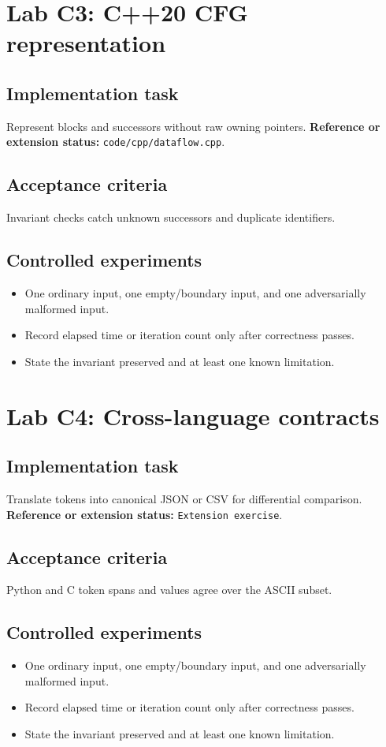 \documentclass[10pt,letterpaper]{article}
\begin{document}
\section{Lab C3: C++20 CFG representation}
\subsection{Implementation task}
Represent blocks and successors without raw owning pointers.
\textbf{Reference or extension status:} \nolinkurl{code/cpp/dataflow.cpp}.\par\subsection{Acceptance criteria}
Invariant checks catch unknown successors and duplicate identifiers.
\subsection{Controlled experiments}
\begin{itemize}
\item One ordinary input, one empty/boundary input, and one adversarially malformed input.
\item Record elapsed time or iteration count only after correctness passes.
\item State the invariant preserved and at least one known limitation.
\end{itemize}


\section{Lab C4: Cross-language contracts}
\subsection{Implementation task}
Translate tokens into canonical JSON or CSV for differential comparison.
\textbf{Reference or extension status:} \texttt{Extension exercise}.\par\subsection{Acceptance criteria}
Python and C token spans and values agree over the ASCII subset.
\subsection{Controlled experiments}
\begin{itemize}
\item One ordinary input, one empty/boundary input, and one adversarially malformed input.
\item Record elapsed time or iteration count only after correctness passes.
\item State the invariant preserved and at least one known limitation.
\end{itemize}
\end{document}

